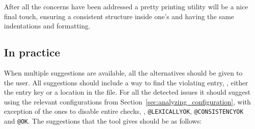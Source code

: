 After all the concerns have been addressed a pretty printing utility
will be a nice final touch, ensuring a consistent structure inside one's
 and having the same indentations and formatting.

\subsection{In practice}
\label{sec:organizing_practice}

When multiple suggestions are available, all the alternatives should
be given to the user.  All suggestions should include a way to find
the violating entry, \ie, either the entry key or a location in the
file.  For all the detected issues it should suggest using the
relevant configurations from
Section~\ref{sec:analyzing_configuration}, with exception of the ones
to disable entire checks, \ie, \texttt{@LEXICALLYOK},
\texttt{@CONSISTENCYOK} and \texttt{@OK}.  The suggestions that the
tool gives should be as follows:

